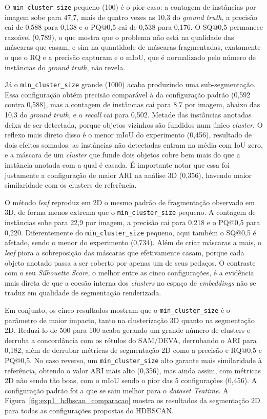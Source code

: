 O \texttt{min\_cluster\_size} pequeno (100) é o pior caso: a contagem de instâncias por imagem sobe para 47,7, mais de quatro vezes as 10,3 do \textit{ground truth}, a precisão cai de 0,588 para 0,138 e o PQ@0,5 cai de 0,538 para 0,176. O SQ@0,5 permanece razoável (0,789), o que mostra que o problema não está na qualidade das máscaras que casam, e sim na quantidade de máscaras fragmentadas, exatamente o que o RQ e a precisão capturam e o mIoU, que é normalizado pelo número de instâncias do \textit{ground truth}, não revela.

Já o \texttt{min\_cluster\_size} grande (1000) acaba produzindo uma sub-segmentação. Essa configuração obtém precisão comparável à da configuração padrão (0,592 contra 0,588), mas a contagem de instâncias cai para 8,7 por imagem, abaixo das 10,3 do \textit{ground truth}, e o \textit{recall} cai para 0,502. Metade das instâncias anotadas deixa de ser detectada, porque objetos vizinhos são fundidos num único \textit{cluster}. O reflexo mais direto disso é o menor mIoU do experimento (0,456), resultado de dois efeitos somados: as instâncias não detectadas entram na média com IoU zero, e a máscara de um \textit{cluster} que funde dois objetos cobre bem mais do que a instância anotada com a qual é casada. É importante notar que essa foi justamente a configuração de maior ARI na análise 3D (0,356), havendo maior similaridade com os clusters de referência.

O método \textit{leaf} reproduz em 2D o mesmo padrão de fragmentação observado em 3D, de forma menos extrema que o \texttt{min\_cluster\_size} pequeno. A contagem de instâncias sobe para 22,9 por imagem, a precisão cai para 0,218 e o PQ@0,5 para 0,220. Diferentemente do \texttt{min\_cluster\_size} pequeno, aqui também o SQ@0,5 é afetado, sendo o menor do experimento (0,734). Além de criar máscaras a mais, o \textit{leaf} piora a sobreposição das máscaras que efetivamente casam, porque cada objeto anotado passa a ser coberto por apenas um de seus pedaços. O contraste com o seu \textit{Silhouette Score}, o melhor entre as cinco configurações, é a evidência mais direta de que a coesão interna dos \textit{clusters} no espaço de \textit{embeddings} não se traduz em qualidade de segmentação renderizada.

Em conjunto, os cinco resultados mostram que o \texttt{min\_cluster\_size} é o parâmetro de maior impacto, tanto na clusterização 3D quanto na segmentação 2D. Reduzi-lo de 500 para 100 acaba gerando um grande número de clusters e derruba a concordância com os rótulos do SAM/DEVA, derrubando o ARI para 0,182, além de derrubar métricas de segmentação 2D como a precisão e RQ@0,5 e PQ@0,5. No caso reverso, um \texttt{min\_cluster\_size} alto garante mais similaridade à referência, obtendo o valor ARI mais alto (0,356), mas ainda assim, com métricas 2D não sendo tão boas, com o mIoU sendo o pior das 5 configurações (0,456). A configuração padrão foi a que se saiu melhor para o \textit{dataset Teatime}. A Figura~\ref{fig:exp1_hdbscan_comparacao} mostra os resultados da segmentação 2D para todas as configurações propostas do HDBSCAN.

